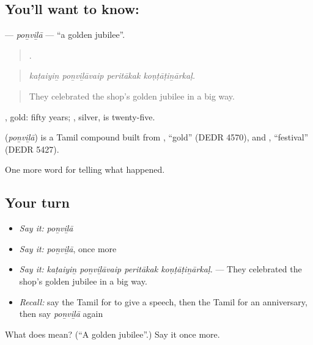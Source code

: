 \subsection*{You'll want to know: }
\textbf{} — \emph{poṉviḻā} — \textquotedblleft{}a golden jubilee\textquotedblright{}.

\begin{quote}
   .
\end{quote}

\begin{quote}
\emph{kaṭaiyiṉ poṉviḻāvaip peritākak koṇṭāṭiṉārkaḷ.}
\end{quote}

\begin{quote}
They celebrated the shop's golden jubilee in a big way.
\end{quote}

, gold: fifty years; , silver, is twenty-five.

\begin{cousinweb}
\textbf{} (\emph{poṉviḻā}) is a Tamil compound built from , \textquotedblleft{}gold\textquotedblright{} (DEDR 4570), and , \textquotedblleft{}festival\textquotedblright{} (DEDR 5427).
\end{cousinweb}

\begin{grammarlens}[title={What you've built}]
One more word for telling what happened.
\end{grammarlens}

\subsection*{Your turn}
\begin{itemize}
\raggedright
  \item \emph{Say it:} \emph{poṉviḻā}
  \item \emph{Say it:} \emph{poṉviḻā}, once more
  \item \emph{Say it:} \emph{kaṭaiyiṉ poṉviḻāvaip peritākak koṇṭāṭiṉārkaḷ.} — They celebrated the shop's golden jubilee in a big way.
  \item \emph{Recall:} say the Tamil for to give a speech, then the Tamil for an anniversary, then say \emph{poṉviḻā} again
\end{itemize}

\begin{tcolorbox}[breakable,colback=teal!4,colframe=teal!35!black,title={Before you move on}]
What does  mean? (\textquotedblleft{}A golden jubilee\textquotedblright{}.) Say it once more.
\end{tcolorbox}
